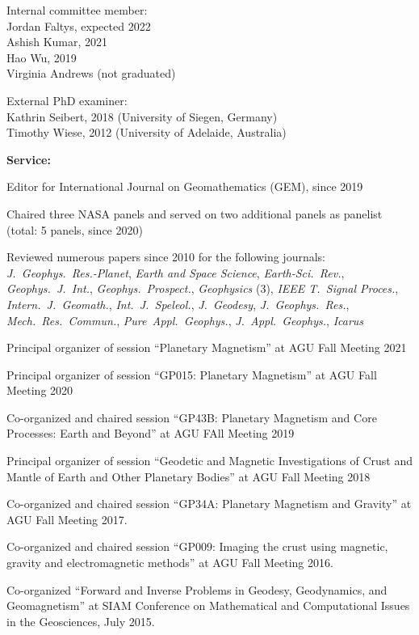 \documentclass[10pt]{article}
\begin{document}
\spcp
Internal committee member:\\
Jordan Faltys, expected 2022 \\
Ashish Kumar, 2021\\
Hao Wu, 2019\\
Virginia Andrews (not graduated)

\spcp
External PhD examiner:\\
Kathrin Seibert, 2018 (University of Siegen, Germany)\\
Timothy Wiese, 2012 (University of Adelaide, Australia)




\spc
\textbf{\tsize Service:}

\spcp
Editor for International Journal on Geomathematics (GEM), since 2019

\spcp
Chaired three NASA panels and served on two
additional panels as panelist (total: 5 panels, since 2020)

\spcp
Reviewed numerous papers since 2010 for the following journals:\\
\emph{J.~Geophys.~Res.-Planet},
\emph{Earth and Space Science},
\emph{Earth-Sci.~Rev.},
\emph{Geophys.~J.~Int.},
\emph{Geophys.~Prospect.},
\emph{Geophysics} (3),
\emph{IEEE T.~Signal Proces.},
\emph{Intern.~J.~Geomath.},
\emph{Int.~J.~Speleol.},
\emph{J.~Geodesy},
\emph{J.~Geophys.~Res.},
\emph{Mech.~Res.~Commun.},
\emph{Pure~Appl.~Geophys.},
\emph{J.~Appl.~Geophys.},
\emph{Icarus}

\spcp
Principal organizer of session ``Planetary Magnetism'' at AGU Fall Meeting 2021

\spcp
Principal organizer of session ``GP015: Planetary Magnetism'' at AGU Fall Meeting 2020

\spcp Co-organized and chaired session ``GP43B: Planetary Magnetism
and Core Processes: Earth and Beyond'' at AGU FAll Meeting 2019


\spcp Principal organizer of session ``Geodetic and Magnetic
Investigations of Crust and Mantle of Earth and Other Planetary
Bodies'' at AGU Fall Meeting 2018



\spcp
Co-organized and chaired session
``GP34A: Planetary Magnetism and Gravity''
at AGU Fall Meeting 2017.
          
\spcp
Co-organized and chaired session
``GP009: Imaging the crust using magnetic, gravity and electromagnetic methods''
at AGU Fall Meeting 2016.

\spcp Co-organized ``Forward and Inverse Problems in Geodesy,
Geodynamics, and Geomagnetism'' at SIAM Conference on Mathematical and
Computational Issues in the Geosciences, July 2015.
\end{document}
